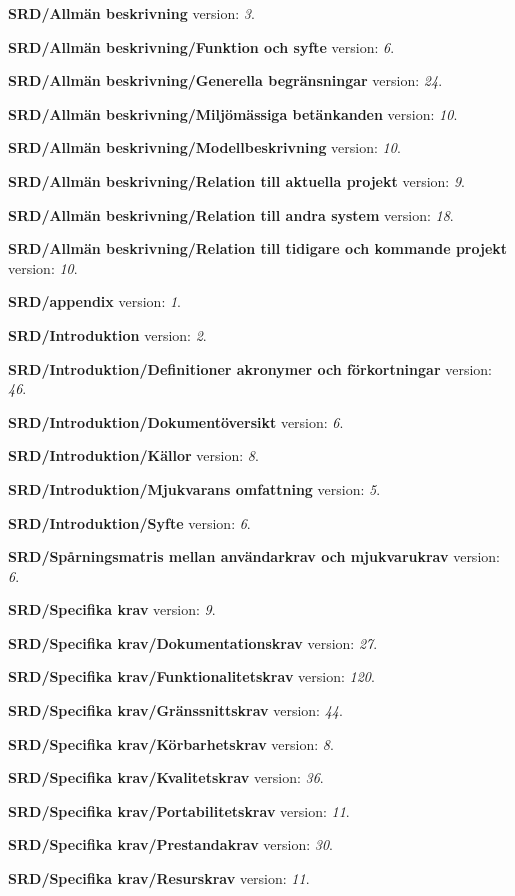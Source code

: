 \documentclass[a4paper, twoside, 11pt, titlepage]{article}
\begin{document}
\textbf{SRD/Allmän beskrivning} version: \emph{3}.

\textbf{SRD/Allmän beskrivning/Funktion och syfte} version: \emph{6}.

\textbf{SRD/Allmän beskrivning/Generella begränsningar} version: \emph{24}.

\textbf{SRD/Allmän beskrivning/Miljömässiga betänkanden} version: \emph{10}.

\textbf{SRD/Allmän beskrivning/Modellbeskrivning} version: \emph{10}.

\textbf{SRD/Allmän beskrivning/Relation till aktuella projekt} version: \emph{9}.

\textbf{SRD/Allmän beskrivning/Relation till andra system} version: \emph{18}.

\textbf{SRD/Allmän beskrivning/Relation till tidigare och kommande projekt} version: \emph{10}.

\textbf{SRD/appendix} version: \emph{1}.

\textbf{SRD/Introduktion} version: \emph{2}.

\textbf{SRD/Introduktion/Definitioner akronymer och förkortningar} version: \emph{46}.

\textbf{SRD/Introduktion/Dokumentöversikt} version: \emph{6}.

\textbf{SRD/Introduktion/Källor} version: \emph{8}.

\textbf{SRD/Introduktion/Mjukvarans omfattning} version: \emph{5}.

\textbf{SRD/Introduktion/Syfte} version: \emph{6}.

\textbf{SRD/Spårningsmatris mellan användarkrav och mjukvarukrav} version: \emph{6}.

\textbf{SRD/Specifika krav} version: \emph{9}.

\textbf{SRD/Specifika krav/Dokumentationskrav} version: \emph{27}.

\textbf{SRD/Specifika krav/Funktionalitetskrav} version: \emph{120}.

\textbf{SRD/Specifika krav/Gränssnittskrav} version: \emph{44}.

\textbf{SRD/Specifika krav/Körbarhetskrav} version: \emph{8}.

\textbf{SRD/Specifika krav/Kvalitetskrav} version: \emph{36}.

\textbf{SRD/Specifika krav/Portabilitetskrav} version: \emph{11}.

\textbf{SRD/Specifika krav/Prestandakrav} version: \emph{30}.

\textbf{SRD/Specifika krav/Resurskrav} version: \emph{11}.
\end{document}
